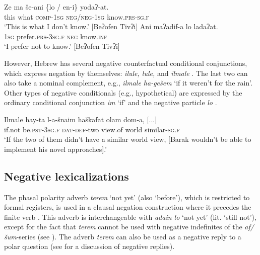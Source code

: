 \documentclass[output=paper,colorlinks,citecolor=brown]{langscibook}
\begin{document}
\ea\label{ex:heb:11}
    \ea\label{ex:heb:11a}
        \gll Ze ma še-ani {\{lo / en-i\}} yodaʔ{}-at.\\
        this what \textsc{comp}{}-1\textsc{sg} \textsc{neg/neg-1sg} know.\textsc{prs-sg.f}\\
        \glt ‘This is what I don’t know.’ [Beʔofen Tivʔi]
    \ex\label{ex:heb:11b}
        \gll Ani maʔadif-a lo ladaʔat.\\
             \textsc{1sg} prefer.\textsc{prs-3sg.f} \textsc{neg} know.\textsc{inf}\\
        \glt ‘I prefer not to know.' [Beʔofen Tivʔi]
    \z 
\z 

However, Hebrew has several negative counterfactual conditional conjunctions, which express negation by themselves: \textit{ilule, lule,} and \textit{ilmale} . The last two can also take a nominal complement, e.g., \textit{ilmale ha-gešem} ‘if it weren’t for the rain’. Other types of negative conditionals (e.g., hypothetical) are expressed by the ordinary conditional conjunction \textit{im} ‘if’ and the negative particle \textit{lo} \citep[378--381]{Tzivoni1993}.

\ea\label{ex:heb:12}
    \gll Ilmale hay-ta l-a-šnaim haškafat olam dom-a, [...]\\ 
        if.not be.\textsc{pst-3sg.f} \textsc{dat}{}-\textsc{def}{}-two view.of world similar-\textsc{sg.f} \\
    \glt ‘If the two of them didn’t have a similar world view, [Barak wouldn’t be able to implement his novel approaches].' \citep[381]{Tzivoni1993}
\z 

\subsection{Negative lexicalizations} \label{sec:heb:2.5}

The phasal polarity adverb \textit{terem} ‘not yet' (also ‘before'), which is restricted to formal registers, is used in a clausal negation construction where it precedes the finite verb . This adverb is interchangeable with \textit{adain lo} ‘not yet' (lit. ‘still not'), except for the fact that \textit{terem} cannot be used with negative indefinites of the \textit{af/šum}{}-series  (see ). The adverb \textit{terem} can also be used as a negative reply to a polar question  (see  for a discussion of negative replies).

\ea\label{ex:heb:13}
    \z
\z
\end{document}
